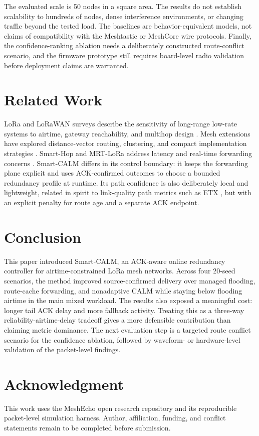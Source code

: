 \documentclass[10pt,conference,letterpaper]{IEEEtran}
\begin{document}
The evaluated scale is 50 nodes in a square area. The results do not establish
scalability to hundreds of nodes, dense interference environments, or changing
traffic beyond the tested load. The baselines are behavior-equivalent models,
not claims of compatibility with the Meshtastic or MeshCore wire protocols.
Finally, the confidence-ranking ablation needs a deliberately constructed
route-conflict scenario, and the firmware prototype still requires
board-level radio validation before deployment claims are warranted.


\section{Related Work}

LoRa and LoRaWAN surveys describe the sensitivity of long-range low-rate
systems to airtime, gateway reachability, and multihop design
\cite{augustin2016study,cotrim2020lorawanmesh,osorio2020routing}. Mesh
extensions have explored distance-vector routing, clustering, and compact
implementation strategies \cite{pueyo2024minimalistic,zhu2019improving,
sole2022implementation}. Smart-Hop and MRT-LoRa address latency and
real-time forwarding concerns \cite{ahmar2022smarthop,leonardi2023mrt}.
Smart-CALM differs in its control boundary: it keeps the forwarding plane
explicit and uses ACK-confirmed outcomes to choose a bounded redundancy
profile at runtime. Its path confidence is also deliberately local and
lightweight, related in spirit to link-quality path metrics such as ETX
\cite{decouto2003etx}, but with an explicit penalty for route age and a
separate ACK endpoint.


\section{Conclusion}

This paper introduced Smart-CALM, an ACK-aware online redundancy controller for
airtime-constrained LoRa mesh networks. Across four 20-seed scenarios, the
method improved source-confirmed delivery over managed flooding, route-cache
forwarding, and nonadaptive CALM while staying below flooding airtime in the
main mixed workload. The results also exposed a meaningful cost: longer tail
ACK delay and more fallback activity. Treating this as a three-way
reliability-airtime-delay tradeoff gives a more defensible contribution than
claiming metric dominance. The next evaluation step is a targeted route
conflict scenario for the confidence ablation, followed by waveform- or
hardware-level validation of the packet-level findings.


\section*{Acknowledgment}

This work uses the MeshEcho open research repository and its reproducible
packet-level simulation harness. Author, affiliation, funding, and conflict
statements remain to be completed before submission.




\end{document}

